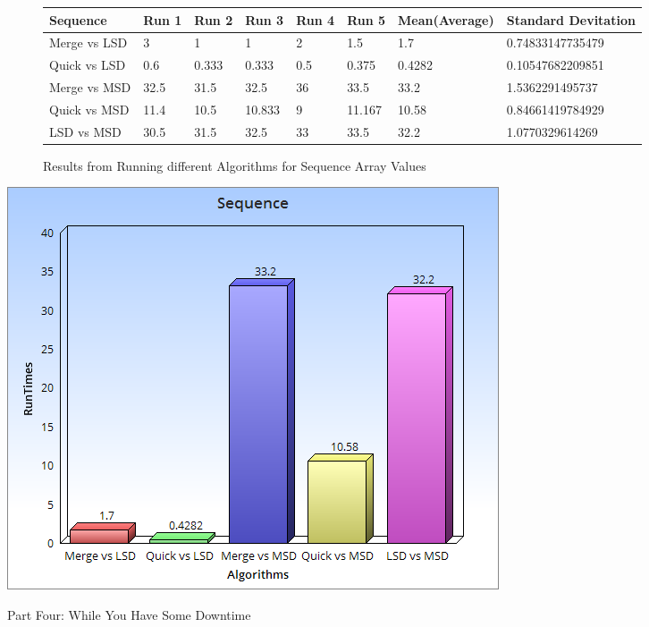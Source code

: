 \documentclass{article}
\begin{document}
\begin{center}
\begin{figure}[H]
\begin{tabular}{| l | l | l | l | l | l | l | l |}
\hline
Sequence & Run 1 & Run 2 & Run 3 & Run 4 & Run 5 & Mean(Average) & Standard Devitation\\ \hline
Merge vs LSD & 3 & 1 & 1  & 2 & 1.5 & 1.7 & 0.74833147735479 \\ \hline
Quick vs LSD & 0.6 & 0.333 & 0.333  & 0.5 & 0.375 & 0.4282 & 0.10547682209851 \\ \hline
Merge vs MSD & 32.5 & 31.5 & 32.5 & 36 & 33.5 & 33.2 & 1.5362291495737\\ \hline
Quick vs MSD & 11.4 & 10.5 & 10.833 & 9 & 11.167 & 10.58 & 0.84661419784929 \\ \hline
LSD vs MSD & 30.5 & 31.5 & 32.5 & 33 & 33.5 & 32.2 & 1.0770329614269\\ \hline
\end{tabular}
\caption{Results from Running  different Algorithms for Sequence Array Values}
\end{figure}
\end{center}
\includegraphics[scale=0.6]{Sequence.png}
\newpage
\begin{center}
Part Four: While You Have Some Downtime
\end{center}
\end{document}
